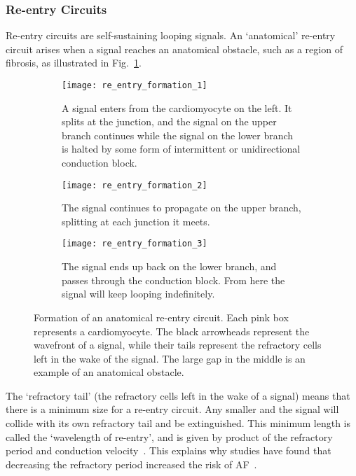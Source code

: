 \subsubsection{Re-entry Circuits}

Re-entry circuits are self-sustaining looping signals.
An `anatomical' re-entry circuit arises when a signal reaches an anatomical obstacle, such as a region of fibrosis, as illustrated in Fig.~\ref{fig:litreviewreentry}.

\begin{figure} \begin{mdframed}
    \centering
    \begin{subfigure}[b]{0.8\textwidth}
        \texttt{[image: re\_entry\_formation\_1]}
        \caption{A signal enters from the cardiomyocyte on the left. It splits at the junction, and the signal on the upper branch continues while the signal on the lower branch is halted by some form of intermittent or unidirectional conduction block.  \\ }
    \end{subfigure}
    
    \begin{subfigure}[b]{0.8\textwidth}
        \texttt{[image: re\_entry\_formation\_2]}
        \caption{The signal continues to propagate on the upper branch, splitting at each junction it meets. \\ }
    \end{subfigure}
    
    \begin{subfigure}[b]{0.8\textwidth}
        \texttt{[image: re\_entry\_formation\_3]}
        \caption{The signal ends up back on the lower branch, and passes through the conduction block. From here the signal will keep looping indefinitely.}
    \end{subfigure}
    \caption{Formation of an anatomical re-entry circuit. Each pink box represents a cardiomyocyte. The black arrowheads represent the wavefront of a signal, while their tails represent the refractory cells left in the wake of the signal. The large gap in the middle is an example of an anatomical obstacle.}
    \label{fig:litreviewreentry}
\end{mdframed} \end{figure}

The `refractory tail' (the refractory cells left in the wake of a signal) means that there is a minimum size for a re-entry circuit. Any smaller and the signal will collide with its own refractory tail and be extinguished. This minimum length is called the `wavelength of re-entry', and is given by product of the refractory period and conduction velocity~\cite{rensma1988length}. This explains why studies have found that decreasing the refractory period increased the risk of AF~\cite{rensma1988length}.

